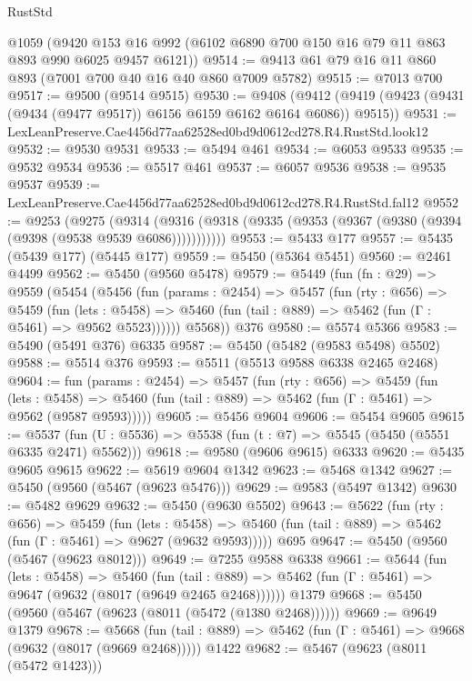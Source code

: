\begin{lexlean}{RustStd}
\begin{coremodule}
    @1059
    (@9420 @153 @16 @992 (@6102 @6890 @700 @150 @16 @79 @11 @863 @893 @990 @6025 @9457 @6121))
@9514 := @9413 @61 @79 @16 @11 @860 @893 (@7001 @700 @40 @16 @40 @860 @7009 @5782)
@9515 := @7013 @700
@9517 := @9500 (@9514 @9515)
@9530 := @9408
    (@9412 (@9419 (@9423 (@9431 (@9434 (@9477 @9517)) @6156 @6159 @6162 @6164 @6086)) @9515))
@9531 := LexLeanPreserve.Cae4456d77aa62528ed0bd9d0612cd278.R4.RustStd.look12
@9532 := @9530 @9531
@9533 := @5494 @461
@9534 := @6053 @9533
@9535 := @9532 @9534
@9536 := @5517 @461
@9537 := @6057 @9536
@9538 := @9535 @9537
@9539 := LexLeanPreserve.Cae4456d77aa62528ed0bd9d0612cd278.R4.RustStd.fal12
@9552 := @9253
    (@9275
      (@9314 (@9316 (@9318 (@9335 (@9353 (@9367 (@9380 (@9394 (@9398 (@9538 @9539 @6086)))))))))))
@9553 := @5433 @177
@9557 := @5435 (@5439 @177) (@5445 @177)
@9559 := @5450 (@5364 @5451)
@9560 := @2461 @4499
@9562 := @5450 (@9560 @5478)
@9579 := @5449
    (fun (fn : @29) =>
    @9559
      (@5454
        (@5456
          (fun (params : @2454) =>
          @5457
            (fun (rty : @656) =>
            @5459
              (fun (lets : @5458) =>
              @5460 (fun (tail : @889) => @5462 (fun (Γ : @5461) => @9562 @5523))))))
        @5568))
    @376
@9580 := @5574 @5366
@9583 := @5490 (@5491 @376) @6335
@9587 := @5450 (@5482 (@9583 @5498) @5502)
@9588 := @5514 @376
@9593 := @5511 (@5513 @9588 @6338 @2465 @2468)
@9604 := fun (params : @2454) =>
  @5457
    (fun (rty : @656) =>
    @5459
      (fun (lets : @5458) =>
      @5460 (fun (tail : @889) => @5462 (fun (Γ : @5461) => @9562 (@9587 @9593)))))
@9605 := @5456 @9604
@9606 := @5454 @9605
@9615 := @5537 (fun (U : @5536) => @5538 (fun (t : @7) => @5545 (@5450 (@5551 @6335 @2471) @5562)))
@9618 := @9580 (@9606 @9615) @6333
@9620 := @5435 @9605 @9615
@9622 := @5619 @9604 @1342
@9623 := @5468 @1342
@9627 := @5450 (@9560 (@5467 (@9623 @5476)))
@9629 := @9583 (@5497 @1342)
@9630 := @5482 @9629
@9632 := @5450 (@9630 @5502)
@9643 := @5622
    (fun (rty : @656) =>
    @5459
      (fun (lets : @5458) =>
      @5460 (fun (tail : @889) => @5462 (fun (Γ : @5461) => @9627 (@9632 @9593)))))
    @695
@9647 := @5450 (@9560 (@5467 (@9623 @8012)))
@9649 := @7255 @9588 @6338
@9661 := @5644
    (fun (lets : @5458) =>
    @5460
      (fun (tail : @889) => @5462 (fun (Γ : @5461) => @9647 (@9632 (@8017 (@9649 @2465 @2468))))))
    @1379
@9668 := @5450 (@9560 (@5467 (@9623 (@8011 (@5472 (@1380 @2468))))))
@9669 := @9649 @1379
@9678 := @5668
    (fun (tail : @889) => @5462 (fun (Γ : @5461) => @9668 (@9632 (@8017 (@9669 @2468)))))
    @1422
@9682 := @5467 (@9623 (@8011 (@5472 @1423)))

\end{coremodule}
\end{lexlean}
